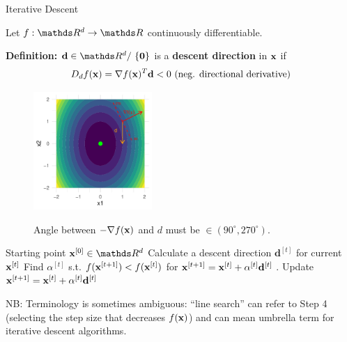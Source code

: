 \documentclass[11pt,compress,t,notes=noshow, xcolor=table]{beamer}
\begin{document}
\begin{vbframe}{Iterative Descent}

	Let $f: \R^d \to \R$ continuously differentiable.
	
	\lz
	
	\textbf{Definition:} $\mathbf{d}\in \R^d /\ \{\mathbf{0}\}$ is a \textbf{descent direction} in $\mathbf{x}$ if
	$$
	D_d f(\mathbf{x}) = \nabla f(\mathbf{x}) ^T \mathbf{d} < 0 \text{ (neg. directional derivative)}
	$$

	\begin{figure}
		\includegraphics[width = 0.4\textwidth]{figure_man/descent_direction.pdf} \\
		\begin{footnotesize}
			Angle between $- \nabla f(\mathbf{x})$ and $d$ must be $\in (90^{\circ}, 270^{\circ})$. 
		\end{footnotesize}
	\end{figure}



	\framebreak
	
	\begin{algorithm}[H]
	  \caption{Iterative Descent / Line search}
	  \begin{algorithmic}[1]
	  \State Starting point $\xv^{[0]} \in \R^d$
	    \State Calculate a descent direction $\mathbf{d}^{[t]}$ for current $\mathbf{x}^{[t]}$
	    \State Find $\alpha^{[t]}$ s.t. $f(\mathbf{x}^{[t + 1]}) < f(\mathbf{x}^{[t]})$ for $\mathbf{x}^{[t + 1]} = \mathbf{x}^{[t]} + \alpha^{[t]} \mathbf{d}^{[t]}$
	   .
	    \State Update $\mathbf{x}^{[t + 1]} = \mathbf{x}^{[t]} + \alpha^{[t]} \mathbf{d}^{[t]}$
	  \EndWhile
	  \end{algorithmic}
	\end{algorithm}
	\vspace*{-0.2cm}
	\begin{tiny}
		NB: Terminology is sometimes ambiguous: ``line search'' can refer to Step 4 (selecting the step size that decreases $f(\mathbf{x})$) and can mean umbrella term for iterative descent algorithms. \par
	\end{tiny}


\end{vbframe}
\end{document}
